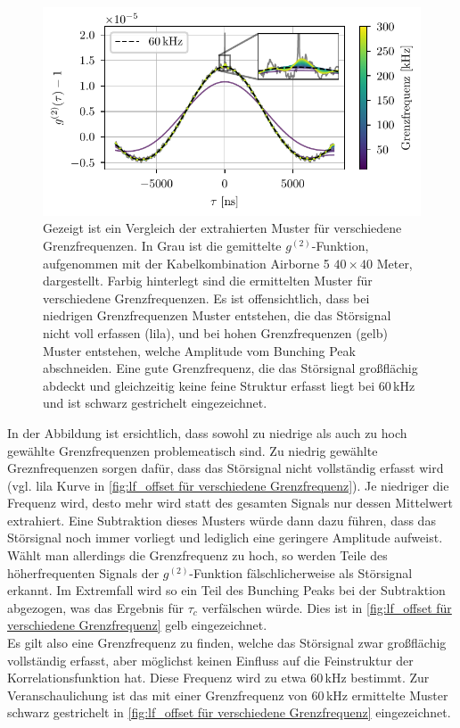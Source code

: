 \begin{figure}[h]
    \centering
    \includegraphics{images/Analysis/lf_offset.pdf}
    \caption{Gezeigt ist ein Vergleich der extrahierten Muster für verschiedene Grenzfrequenzen. In Grau ist die gemittelte $g^{(2)}$-Funktion, aufgenommen mit der Kabelkombination Airborne 5 $40\times 40$ Meter, dargestellt. Farbig hinterlegt sind die ermittelten Muster für verschiedene Grenzfrequenzen. Es ist offensichtlich, dass bei niedrigen Grenzfrequenzen Muster entstehen, die das Störsignal nicht voll erfassen (lila), und bei hohen Grenzfrequenzen (gelb) Muster entstehen, welche Amplitude vom Bunching Peak abschneiden. Eine gute Grenzfrequenz, die das Störsignal großflächig abdeckt und gleichzeitig keine feine Struktur erfasst liegt bei 60\,kHz und ist schwarz gestrichelt eingezeichnet.}
    \label{fig:lf_offset für verschiedene Grenzfrequenz}
\end{figure}
In der Abbildung ist ersichtlich, dass sowohl zu niedrige als auch zu hoch gewählte Grenzfrequenzen problemeatisch sind. 
Zu niedrig gewählte Greznfrequenzen sorgen dafür, dass das Störsignal nicht vollständig erfasst wird (vgl. lila Kurve in \autoref{fig:lf_offset für verschiedene Grenzfrequenz}). 
Je niedriger die Frequenz wird, desto mehr wird statt des gesamten Signals nur dessen Mittelwert extrahiert. 
Eine Subtraktion dieses Musters würde dann dazu führen, dass das Störsignal noch immer vorliegt und lediglich eine geringere Amplitude aufweist. 
Wählt man allerdings die Grenzfrequenz zu hoch, so werden Teile des höherfrequenten Signals der $g^{(2)}$-Funktion fälschlicherweise als Störsignal erkannt. 
Im Extremfall wird so ein Teil des Bunching Peaks bei der Subtraktion abgezogen, was das Ergebnis für $\tau_c$ verfälschen würde. 
Dies ist in \autoref{fig:lf_offset für verschiedene Grenzfrequenz} gelb eingezeichnet. \\
Es gilt also eine Grenzfrequenz zu finden, welche das Störsignal zwar großflächig vollständig erfasst, aber möglichst keinen Einfluss auf die Feinstruktur der Korrelationsfunktion hat. 
Diese Frequenz wird zu etwa 60\,kHz bestimmt. 
Zur Veranschaulichung ist das mit einer Grenzfrequenz von 60\,kHz ermittelte Muster schwarz gestrichelt in \autoref{fig:lf_offset für verschiedene Grenzfrequenz} eingezeichnet. \\


